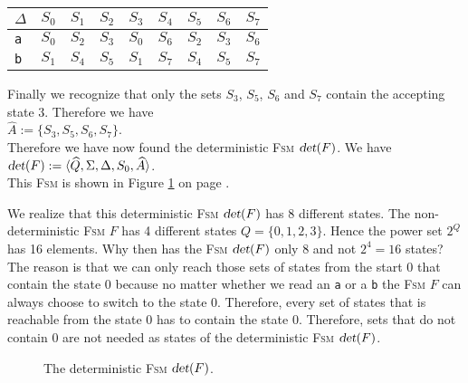 \begin{center}
\begin{tabular}[t]{|l||c|c|c|c|c|c|c|c|}
\hline
$\Delta$ & $S_0$ & $S_1$ & $S_2$ & $S_3$ & $S_4$ & $S_5$ & $S_6$ & $S_7$ \\
\hline
\hline
\texttt{a} & $S_0$ & $S_2$ & $S_3$ & $S_0$ & $S_6$ & $S_2$ & $S_3$ & $S_6$ \\
\hline
\texttt{b} & $S_1$ & $S_4$ & $S_5$ & $S_1$ & $S_7$ & $S_4$ & $S_5$ & $S_7$ \\
\hline
\end{tabular}
\end{center}
Finally we recognize that only the sets  $S_3$, $S_5$, $S_6$ and $S_7$ contain the accepting state
 $3$.  Therefore we have
\\[0.2cm]
\hspace*{1.3cm}
$\widehat{A} := \{ S_3, S_5, S_6, S_7 \}$.
\\[0.2cm]
Therefore we have now found the deterministic \textsc{Fsm} $\textsl{det}(F)$. We have
\\[0.2cm]
\hspace*{1.3cm}
$\textsl{det}(F) := \langle \widehat{Q}, \Sigma, \Delta, S_0, \widehat{A}\rangle$.
\\[0.2cm]
This \textsc{Fsm} is shown in Figure \ref{fig:a2.eps} on page \pageref{fig:a2.eps}.

We realize that this deterministic \textsc{Fsm} $\textsl{det}(F)$ has 8 different states. 
The non-deterministic \textsc{Fsm} $F$ has 4 different states
 $Q = \{ 0, 1, 2, 3 \}$.  Hence the power set $2^Q$ has 16 elements.
Why then has the \textsc{Fsm} $\textsl{det}(F)$ only 8 and not $2^4 = 16$ states?
The reason is that we can only reach those sets of states from the start $0$
that contain the state $0$ because no matter whether we read an \texttt{a} or a \texttt{b}
the \textsc{Fsm} $F$ can always choose to switch to the state $0$.  Therefore, every set of states that is
reachable from the state $0$ has to contain the state $0$.  Therefore, 
sets that do not contain $0$ are not needed as states of the deterministic \textsc{Fsm}
$\textsl{det}(F)$.



\begin{figure}[!ht]
  \centering
     \vspace*{0.5cm}
  \caption{The deterministic \textsc{Fsm} $\textsl{det}(F)$.}
  \label{fig:a2.eps}
\end{figure}


